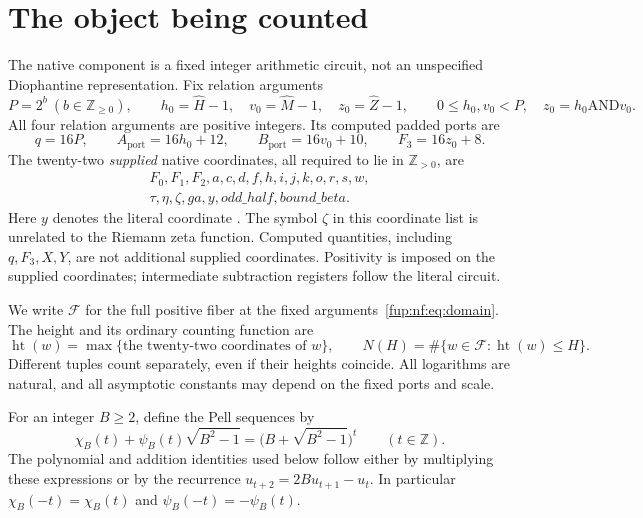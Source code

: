 \documentclass[11pt,letterpaper]{article}
\theoremstyle{definition}\newtheorem{definition}[theorem]{Definition}
\theoremstyle{remark}\newtheorem{remark}[theorem]{Remark}
\newcommand{\Z}{\mathbb Z}\newcommand{\Np}{\mathbb Z_{>0}}
\newcommand{\AND}{\mathbin{\mathrm{AND}}}
\newcommand{\file}[1]{\texttt{\detokenize{#1}}}
\begin{document}
\section{The object being counted}
The native component is a fixed integer arithmetic circuit, not an unspecified Diophantine representation. Fix relation arguments
\begin{equation}\label{fup:nf:eq:domain}
 P=2^b\ (b\in\Z_{\ge0}),\qquad
 h_0=\widehat H-1,\quad v_0=\widehat M-1,\quad z_0=\widehat Z-1,
 \qquad 0\le h_0,v_0<P,\quad z_0=h_0\AND v_0.
\end{equation}
All four relation arguments are positive integers. Its computed padded ports are
\begin{equation}\label{fup:nf:eq:ports}
 q=16P,\qquad A_{\mathrm{port}}=16h_0+12,\qquad
 B_{\mathrm{port}}=16v_0+10,\qquad F_3=16z_0+8.
\end{equation}
The twenty-two \emph{supplied} native coordinates, all required to lie in $\Np$, are
\begin{equation}\label{fup:nf:eq:coords}
\begin{gathered}
 F_0,F_1,F_2,a,c,d,f,h,i,j,k,o,r,s,w,\\
 \tau,\eta,\zeta,\mathit{ga},y,\mathit{odd\_half},\mathit{bound\_beta}.
\end{gathered}
\end{equation}
Here $y$ denotes the literal coordinate \file{y_aux}. The symbol $\zeta$ in this coordinate list is unrelated to the Riemann zeta function. Computed quantities, including $q,F_3,X,Y$, are not additional supplied coordinates. Positivity is imposed on the supplied coordinates; intermediate subtraction registers follow the literal circuit.

We write $\mathcal F$ for the full positive fiber at the fixed arguments~\eqref{fup:nf:eq:domain}. The height and its ordinary counting function are
\[
 \operatorname{ht}(w)=\max\{\text{the twenty-two coordinates of }w\},
 \qquad N(H)=\#\{w\in\mathcal F:\operatorname{ht}(w)\le H\}.
\]
Different tuples count separately, even if their heights coincide. All logarithms are natural, and all asymptotic constants may depend on the fixed ports and scale.

For an integer $B\ge2$, define the Pell sequences by
\begin{equation}\label{fup:nf:eq:pell}
 \chi_B(t)+\psi_B(t)\sqrt{B^2-1}
 =\bigl(B+\sqrt{B^2-1}\bigr)^t\qquad(t\in\Z).
\end{equation}
The polynomial and addition identities used below follow either by multiplying these expressions or by the recurrence $u_{t+2}=2Bu_{t+1}-u_t$. In particular $\chi_B(-t)=\chi_B(t)$ and $\psi_B(-t)=-\psi_B(t)$.
\end{document}
